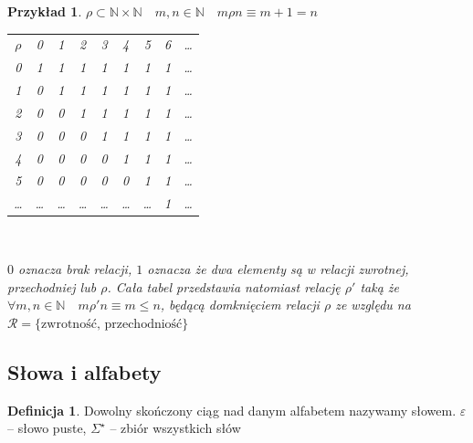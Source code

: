 \documentclass[12pt,a4paper]{article}
\newtheorem{przyklad}{Przykład}
\theoremstyle{definition}
\newtheorem{df}{Definicja}
\theoremstyle{remark}
\begin{document}
\begin{przyklad}
	$\rho \subset \mathbb{N}\times\mathbb{N} \quad m,n \in \mathbb{N} \quad m\rho n \equiv m +1 = n$ \\
	\begin{center}
	\begin{tabular}{ccccccccc}
		$\rho$ & 0 & 1 & 2 & 3 & 4 & 5 & 6 & \dots \\
			0  & {\color{red}1} & {\color{blue}1} & {\color{green}1}  & {\color{green}1}  & {\color{green}1}  & {\color{green}1}  & {\color{green}1}  & \dots \\
			1  & {\color{yellow}0}  & {\color{red}1}  & {\color{blue}1} & {\color{green}1}  & {\color{green}1}  & {\color{green}1}  & {\color{green}1}  & \dots \\
			2  & {\color{yellow}0}  & {\color{yellow}0}  & {\color{red}1}  & {\color{blue}1} & {\color{green}1}  &  {\color{green}1} & {\color{green}1}  & \dots \\
			3  & {\color{yellow}0}  & {\color{yellow}0}  & {\color{yellow}0}  & {\color{red}1}  & {\color{blue}1} & {\color{green}1}  & {\color{green}1}  & \dots \\
			4  & {\color{yellow}0}  & {\color{yellow}0}  & {\color{yellow}0}  & {\color{yellow}0}  & {\color{red}1}  & {\color{blue}1} & {\color{green}1}  & \dots \\
			5  & {\color{yellow}0}  & {\color{yellow}0}  & {\color{yellow}0}  & {\color{yellow}0}  & {\color{yellow}0}  & {\color{red}1}  & {\color{blue}1} & \dots \\
	     \dots & \dots  & \dots  & \dots  & \dots  & \dots  & \dots  & {\color{red}1}  & \dots \\
	\end{tabular}\\
	\end{center}	
	{\color{yellow} $0$ oznacza brak relacji}, $1$ oznacza że dwa elementy są w relacji {\color{red}zwrotnej}, {\color{green}przechodniej} lub {\color{blue}$\rho$}. 
	Cała tabel przedstawia natomiast relację $\rho'$ taką że $\forall m,n \in \mathbb{N} \quad m \rho' n \equiv m \leqslant n$,  będącą domknięciem relacji $\rho$ ze względu na 
	$\mathcal{R} = \{\text{zwrotność, przechodniość}\}$
\end{przyklad}

\subsection{Słowa i alfabety}
	\begin{df}
		Dowolny skończony ciąg nad danym alfabetem nazywamy słowem. $\varepsilon$ -- słowo puste, $\Sigma^\star$ -- zbiór wszystkich słów
	\end{df}
	
\end{document}
